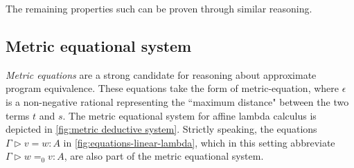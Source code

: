 The remaining properties such can be proven through similar reasoning. 


\subsection{Metric equational system}

\emph{Metric equations} \cite{mardare2016quantitative,mardare2017axiomatizability} are a strong candidate for reasoning about approximate program equivalence. These equations take the form of \gls{metric-equation}, where  $\epsilon$ is a non-negative rational representing the ``maximum distance" between the two terms $t$ and $s$. The metric equational system for affine lambda calculus is depicted in \autoref{fig:metric deductive system}. 
Strictly speaking, the equations $\Gamma \triangleright v = w : A$ in \autoref{fig:equations-linear-lambda}, which in this setting abbreviate $\Gamma \triangleright w =_0 v : A$, are also part of the metric equational system.


